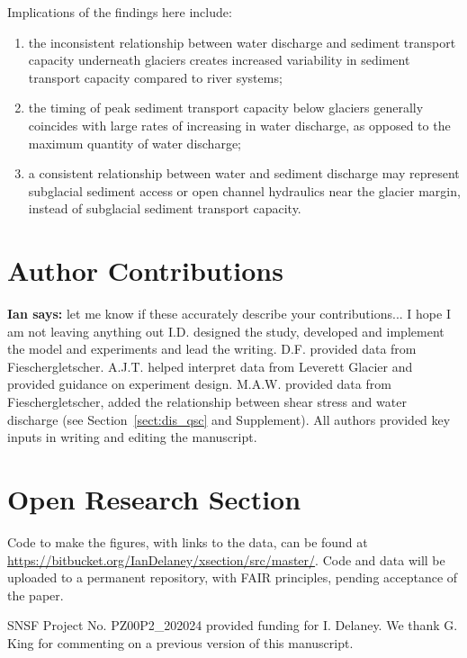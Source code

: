 \documentclass[draft]{agujournal2019}
\newcommand{\ian}[1]{{\textbf{\color{blue}Ian says:} \color{blue} #1} }
\begin{document}
Implications of the findings here include:
\begin{enumerate}
\item the inconsistent relationship between water discharge and sediment transport capacity underneath glaciers creates increased variability in sediment transport capacity compared to river systems;
\item the timing of peak sediment transport capacity below glaciers generally coincides with large rates of increasing in water discharge, as opposed to the maximum quantity of water discharge;
\item a consistent relationship between water and sediment discharge may represent subglacial sediment access or open channel hydraulics near the glacier margin, instead of subglacial sediment transport capacity.

\end{enumerate}

\section*{Author Contributions}
\ian{let me know if these accurately describe your contributions... I hope I am not leaving anything out}
I.D. designed the study, developed and implement the model and experiments and lead the writing.
D.F. provided data from Fieschergletscher.
A.J.T. helped interpret data from Leverett Glacier and provided guidance on experiment design.
M.A.W. provided data from Fieschergletscher, added the relationship between shear stress and water discharge (see Section~\ref{sect:dis_qsc} and Supplement).
All authors provided  key inputs in writing and editing the manuscript. 


\section*{Open Research Section}
Code to make the figures, with links to the data, can be found at \url{https://bitbucket.org/IanDelaney/xsection/src/master/}.
Code and data will be uploaded to a permanent repository, with FAIR principles, pending acceptance of the paper.

\acknowledgments

SNSF Project No. PZ00P2\_202024 provided  funding for I. Delaney.
We thank G. King for commenting on a previous version of this manuscript.




\newpage
\end{document}
